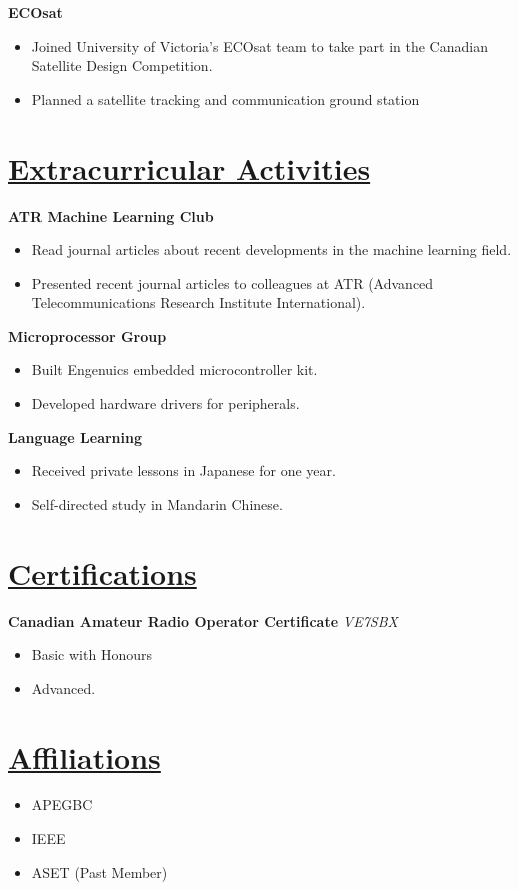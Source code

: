 \documentclass[a4paper, 11pt]{article}
\begin{document}
  \textbf{ECOsat}
  \begin{itemize}[nosep]
    \item Joined University of Victoria's ECOsat team to take part in the Canadian Satellite Design Competition.
    \item Planned a satellite tracking and communication ground station
  \end{itemize}
  
\section{\underline{Extracurricular Activities}}
  \textbf{ATR Machine Learning Club}
  \begin{itemize}[nosep]
    \item Read journal articles about recent developments in the machine learning field.
    \item Presented recent journal articles to colleagues at ATR (Advanced Telecommunications Research Institute International).
  \end{itemize}
  \medskip
      
  \textbf{Microprocessor Group}
  \begin{itemize}[nosep]
    \item Built Engenuics embedded microcontroller kit.
    \item Developed hardware drivers for peripherals.
  \end{itemize}
  \medskip
      
  \textbf{Language Learning}
  \begin{itemize}[nosep]
    \item Received private lessons in Japanese for one year.
    \item Self-directed study in Mandarin Chinese.
  \end{itemize}

\section{\underline{Certifications}}
  \textbf{Canadian Amateur Radio Operator Certificate}
  \hfill
  \emph{VE7SBX}
  \begin{itemize}[nosep]
    \item Basic with Honours
    \item Advanced.
  \end{itemize}
      
\section{\underline{Affiliations}}
  \begin{itemize}[nosep]
    \item APEGBC
    \item IEEE
    \item ASET (Past Member)
  \end{itemize}
\end{document}
